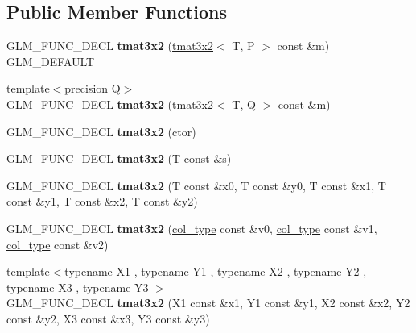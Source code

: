 \subsection*{Public Member Functions}
\begin{DoxyCompactItemize}
\item 
\hypertarget{structglm_1_1tmat3x2_adfa81983174d67e43c90704d4eed33e0}{G\-L\-M\-\_\-\-F\-U\-N\-C\-\_\-\-D\-E\-C\-L {\bfseries tmat3x2} (\hyperlink{structglm_1_1tmat3x2}{tmat3x2}$<$ T, P $>$ const \&m) G\-L\-M\-\_\-\-D\-E\-F\-A\-U\-L\-T}\label{structglm_1_1tmat3x2_adfa81983174d67e43c90704d4eed33e0}

\item 
\hypertarget{structglm_1_1tmat3x2_a238eaf8178ff26a8c6adb554790043ee}{{\footnotesize template$<$precision Q$>$ }\\G\-L\-M\-\_\-\-F\-U\-N\-C\-\_\-\-D\-E\-C\-L {\bfseries tmat3x2} (\hyperlink{structglm_1_1tmat3x2}{tmat3x2}$<$ T, Q $>$ const \&m)}\label{structglm_1_1tmat3x2_a238eaf8178ff26a8c6adb554790043ee}

\item 
\hypertarget{structglm_1_1tmat3x2_aad24e077308331305358d5edc037eb90}{G\-L\-M\-\_\-\-F\-U\-N\-C\-\_\-\-D\-E\-C\-L {\bfseries tmat3x2} (ctor)}\label{structglm_1_1tmat3x2_aad24e077308331305358d5edc037eb90}

\item 
\hypertarget{structglm_1_1tmat3x2_a1e96a3c5687f902ddcd5c02e866653f6}{G\-L\-M\-\_\-\-F\-U\-N\-C\-\_\-\-D\-E\-C\-L {\bfseries tmat3x2} (T const \&s)}\label{structglm_1_1tmat3x2_a1e96a3c5687f902ddcd5c02e866653f6}

\item 
\hypertarget{structglm_1_1tmat3x2_a1f62d6c8afd69d6debf328de00b79c5f}{G\-L\-M\-\_\-\-F\-U\-N\-C\-\_\-\-D\-E\-C\-L {\bfseries tmat3x2} (T const \&x0, T const \&y0, T const \&x1, T const \&y1, T const \&x2, T const \&y2)}\label{structglm_1_1tmat3x2_a1f62d6c8afd69d6debf328de00b79c5f}

\item 
\hypertarget{structglm_1_1tmat3x2_afe45049134abd2fe51d4c695436c826e}{G\-L\-M\-\_\-\-F\-U\-N\-C\-\_\-\-D\-E\-C\-L {\bfseries tmat3x2} (\hyperlink{structglm_1_1tvec2}{col\-\_\-type} const \&v0, \hyperlink{structglm_1_1tvec2}{col\-\_\-type} const \&v1, \hyperlink{structglm_1_1tvec2}{col\-\_\-type} const \&v2)}\label{structglm_1_1tmat3x2_afe45049134abd2fe51d4c695436c826e}

\item 
\hypertarget{structglm_1_1tmat3x2_a26c711383636c9d9cb72a52569f3b94f}{{\footnotesize template$<$typename X1 , typename Y1 , typename X2 , typename Y2 , typename X3 , typename Y3 $>$ }\\G\-L\-M\-\_\-\-F\-U\-N\-C\-\_\-\-D\-E\-C\-L {\bfseries tmat3x2} (X1 const \&x1, Y1 const \&y1, X2 const \&x2, Y2 const \&y2, X3 const \&x3, Y3 const \&y3)}\label{structglm_1_1tmat3x2_a26c711383636c9d9cb72a52569f3b94f}


\end{DoxyCompactItemize}

